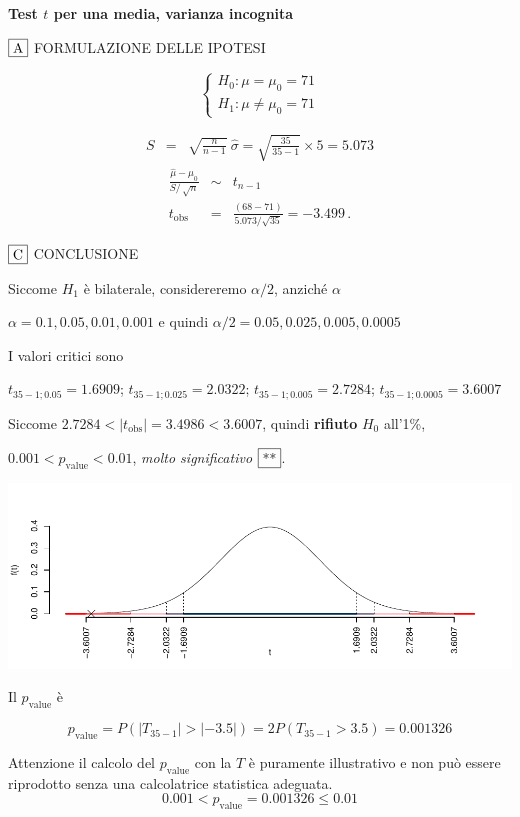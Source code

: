 \documentclass[
  11pt,
]{book}
\theoremstyle{mytheoremstyle}
\theoremstyle{mydefstyle}
\newenvironment{sol}
  {
  \begin{tcolorbox}[enhanced,breakable,arc=0.1mm,boxrule=1pt,colback=white,colframe=iblue,
  title=\bf \fontfamily{lmss}\selectfont \hspace{.5 cm} Soluzione,drop fuzzy shadow]

}{
\end{tcolorbox}
  }
\begin{document}
\begin{sol}
\textbf{Test \(t\) per una media, varianza incognita}

\(\fbox{A}\) FORMULAZIONE DELLE IPOTESI

\[\begin{cases}
   H_0: \mu = \mu_0=71 \\
   H_1: \mu \neq \mu_0=71 
   \end{cases}\]

\begin{eqnarray*}
   S    &=& \sqrt{\frac{n} {n-1}}\ \widehat{\sigma} 
   =  \sqrt{\frac{ 35 } { 35 -1}} \times  5  =  5.073 
   \end{eqnarray*}
\begin{eqnarray*}
   \frac{\hat\mu - \mu_{0}} {S/\,\sqrt{n}}&\sim&t_{n-1}\\
   t_{\text{obs}}
   &=& \frac{ ( 68 -  71 )} { 5.073 /\sqrt{ 35 }}
   =   -3.499 \, .
   \end{eqnarray*}

\(\fbox{C}\) CONCLUSIONE

Siccome \(H_1\) è bilaterale, considereremo \(\alpha/2\),
anziché \(\alpha\)

\(\alpha=0.1, 0.05, 0.01, 0.001\) e quindi \(\alpha/2=0.05, 0.025, 0.005, 0.0005\)

I valori critici sono

\(t_{35-1;0.05}=1.6909\); \(t_{35-1;0.025}=2.0322\); \(t_{35-1;0.005}=2.7284\); \(t_{35-1;0.0005}=3.6007\)

Siccome \(2.7284<|t_\text{obs}|=3.4986<3.6007\), quindi \textbf{rifiuto} \(H_0\) all'1\%,

\(0.001<p_\text{value}<0.01\), \emph{molto significativo} \(\fbox{**}\).

\begin{center}\includegraphics{Esami_passati_con_soluzioni_files/figure-latex/2023-29,-1} \end{center}

Il \(p_{\text{value}}\) è

\[ p_{\text{value}} = P(|T_{35-1}|>|-3.5|)=2P(T_{35-1}>3.5)=0.001326 \]

Attenzione il calcolo del \(p_\text{value}\) con la \(T\) è puramente illustrativo e non può essere riprodotto senza una calcolatrice statistica adeguata.\[
 0.001 < p_\text{value}= 0.001326 \leq 0.01 
\]

\end{sol}
\end{document}
